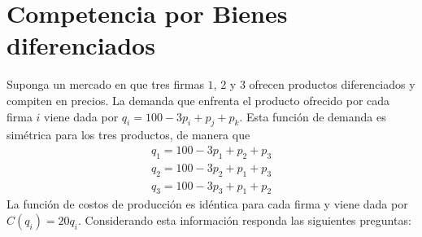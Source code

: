 \section{Competencia por Bienes diferenciados}
Suponga un mercado en que tres firmas $1$, $2$ y $3$ ofrecen productos diferenciados y compiten en precios. La demanda que enfrenta el producto ofrecido por cada firma $i$ viene dada por $q_i = 100 -3p_i +p_j + p_k$. Esta función de demanda es simétrica para los tres productos, de manera que
\begin{align*}
    q_1 = 100-3p_1+p_2+p_3 \\
    q_2 = 100-3p_2+p_1+p_3 \\
    q_3 = 100-3p_3+p_1+p_2
\end{align*}
La función de costos de producción es idéntica para cada firma y viene dada por $C(q_i) = 20q_i$. Considerando esta información responda las siguientes preguntas:

